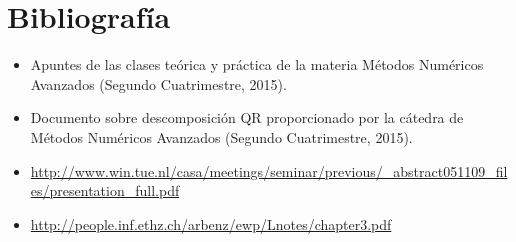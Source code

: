 \documentclass[a4paper,10pt,spanish]{article}
\begin{document}
\pagebreak

\section{Bibliografía}
\begin{itemize}

\item Apuntes de las clases teórica y práctica de la materia Métodos Numéricos Avanzados (Segundo Cuatrimestre, 2015).

\item Documento sobre descomposición QR proporcionado por la cátedra de Métodos Numéricos Avanzados (Segundo Cuatrimestre, 2015).

\item \url{http://www.win.tue.nl/casa/meetings/seminar/previous/_abstract051109_files/presentation_full.pdf}

\item \url{http://people.inf.ethz.ch/arbenz/ewp/Lnotes/chapter3.pdf}

\end{itemize}

\pagebreak
\end{document}
